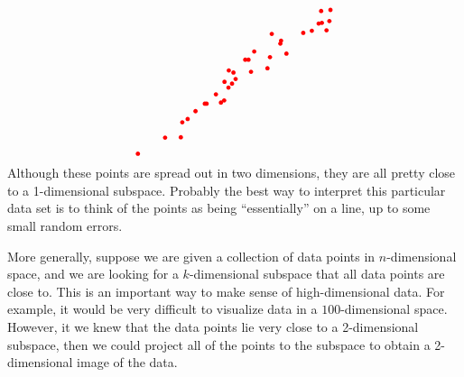 \begin{equation}
\begin{tikzpicture}[baseline=-0.5ex]
    \fill[color=red] (-1.38,-1.17) circle (0.06);
    \fill[color=red] (-0.36,-0.65) circle (0.06);
    \fill[color=red] (1.38,0.66) circle (0.06);
    \fill[color=red] (1.85,1.24) circle (0.06);
    \fill[color=red] (2.35,1.85) circle (0.06);
    \fill[color=red] (0.85,0.25) circle (0.06);
    \fill[color=red] (-0.23,0.19) circle (0.06);
    \fill[color=red] (-0.90,-0.74) circle (0.06);
    \fill[color=red] (2.50,1.31) circle (0.06);
    \fill[color=red] (-0.45,-0.71) circle (0.06);
    \fill[color=red] (0.92,0.56) circle (0.06);
    \fill[color=red] (0.97,1.21) circle (0.06);
    \fill[color=red] (-0.85,-0.74) circle (0.06);
    \fill[color=red] (-0.10,0.13) circle (0.06);
    \fill[color=red] (0.32,0.49) circle (0.06);
    \fill[color=red] (2.58,1.57) circle (0.06);
    \fill[color=red] (-0.59,-0.48) circle (0.06);
    \fill[color=red] (2.28,1.50) circle (0.06);
    \fill[color=red] (1.21,0.94) circle (0.06);
    \fill[color=red] (-0.35,-0.13) circle (0.06);
    \fill[color=red] (-1.53,-1.26) circle (0.06);
    \fill[color=red] (-2.77,-2.14) circle (0.06);
    \fill[color=red] (1.23,1.02) circle (0.06);
    \fill[color=red] (2.61,1.88) circle (0.06);
    \fill[color=red] (-0.04,-0.05) circle (0.06);
    \fill[color=red] (2.09,1.30) circle (0.06);
    \fill[color=red] (2.37,1.52) circle (0.06);
    \fill[color=red] (-2.01,-1.69) circle (0.06);
    \fill[color=red] (0.48,0.72) circle (0.06);
    \fill[color=red] (0.23,0.49) circle (0.06);
    \fill[color=red] (-1.16,-0.95) circle (0.06);
    \fill[color=red] (-0.14,-0.18) circle (0.06);
    \fill[color=red] (-1.57,-1.68) circle (0.06);
    \fill[color=red] (0.39,0.15) circle (0.06);
    \fill[color=red] (-0.24,-0.29) circle (0.06);
  \end{tikzpicture}
\end{equation}
Although these points are spread out in two dimensions, they are all
pretty close to a 1-dimensional subspace. Probably the best way to
interpret this particular data set is to think of the points as being
``essentially'' on a line, up to some small random errors.

More generally, suppose we are given a collection of data points in
$n$-dimensional space, and we are looking for a $k$-dimensional
subspace that all data points are close to.  This is an important way
to make sense of high-dimensional data. For example, it would be very
difficult to visualize data in a $100$-dimensional space. However, it
we knew that the data points lie very close to a 2-dimensional
subspace, then we could project all of the points to the subspace to
obtain a 2-dimensional image of the data.

